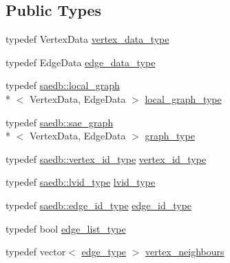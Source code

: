 \subsection*{Public Types}
\begin{DoxyCompactItemize}
\item 
typedef Vertex\-Data \hyperlink{classsaedb_1_1sae__graph_a8e9dfeb979f49c35d427f364fb3f69f5}{vertex\-\_\-data\-\_\-type}
\item 
typedef Edge\-Data \hyperlink{classsaedb_1_1sae__graph_a3f786e0be3d855a988333235a6b50d02}{edge\-\_\-data\-\_\-type}
\item 
typedef \hyperlink{classsaedb_1_1local__graph}{saedb\-::local\-\_\-graph}\\*
$<$ Vertex\-Data, Edge\-Data $>$ \hyperlink{classsaedb_1_1sae__graph_a71b3f3108c15bb3af8362ba078d4cb06}{local\-\_\-graph\-\_\-type}
\item 
typedef \hyperlink{classsaedb_1_1sae__graph}{saedb\-::sae\-\_\-graph}\\*
$<$ Vertex\-Data, Edge\-Data $>$ \hyperlink{classsaedb_1_1sae__graph_a23007633d4d5ca206b659fd585777848}{graph\-\_\-type}
\item 
typedef \hyperlink{namespacesaedb_a502e07e24003e811ae3bd73514c2798a}{saedb\-::vertex\-\_\-id\-\_\-type} \hyperlink{classsaedb_1_1sae__graph_a2f9a7bf2db556689f1cd9de9562ff41f}{vertex\-\_\-id\-\_\-type}
\item 
typedef \hyperlink{namespacesaedb_ae0f2df508bdfd29505d57534c8ed4a65}{saedb\-::lvid\-\_\-type} \hyperlink{classsaedb_1_1sae__graph_afcd2ad6444e374e40a7a5ee4c46be052}{lvid\-\_\-type}
\item 
typedef \hyperlink{namespacesaedb_af76c9a21f199f95828dd18699754cad1}{saedb\-::edge\-\_\-id\-\_\-type} \hyperlink{classsaedb_1_1sae__graph_a5f39a5f8d12ae17fd09fad90004229d7}{edge\-\_\-id\-\_\-type}
\item 
typedef bool \hyperlink{classsaedb_1_1sae__graph_a5801338c962bef55a7bd3a18ebff8e9c}{edge\-\_\-list\-\_\-type}
\item 
typedef vector$<$ \hyperlink{classsaedb_1_1sae__graph_1_1edge__type}{edge\-\_\-type} $>$ \hyperlink{classsaedb_1_1sae__graph_aabe2a7d32910210e6b72c35412adbd1e}{vertex\-\_\-neighbours}
\end{DoxyCompactItemize}
